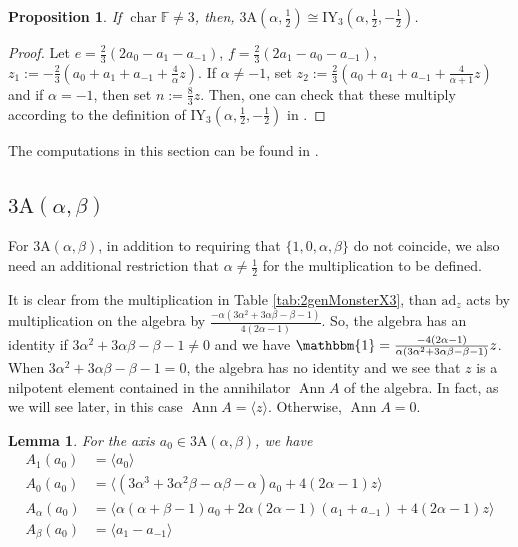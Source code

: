 \documentclass[11pt, a4paper]{article}
\theoremstyle{plain}
\newtheorem{lemma}[theorem]{Lemma}
\newtheorem{proposition}[theorem]{Proposition}
\theoremstyle{definition}
\newcommand\al{\alpha}
\newcommand\bt{\beta}
\newcommand\la{\langle}
\newcommand\ra{\rangle}
\newcommand\ad{\mathrm{ad}}
\DeclareMathOperator{\ch}{char}
\DeclareMathOperator{\Ann}{Ann}
\newcommand\FF{\mathbb{F}}
\newcommand{\A}{\mathrm{A}}
\newcommand{\IY}{\mathrm{IY}}
\newcommand{\0}{\overline{0}}
\newcommand{\2}{\overline{2}}
\newcommand{\1}{\mathbbm{1}}
\begin{document}
\begin{proposition}
If $\ch \FF \neq 3$, then, $3\A(\al, \frac{1}{2}) \cong \IY_3(\al, \frac{1}{2}, -\frac{1}{2})$.
\end{proposition}
\begin{proof}
Let $e = \frac{2}{3}(2a_0-a_1-a_{-1})$, $f = \frac{2}{3}(2a_1-a_0-a_{-1})$, $z_1 := -\frac{2}{3}(a_0 + a_1 + a_{-1} + \frac{4}{\al}z)$.  If $\al \neq -1$, set $z_2 := \frac{2}{3}(a_0 + a_1 + a_{-1} + \frac{4}{\al+1}z)$ and if $\al = -1$, then set $n := \frac{8}{3}z$.  Then, one can check that these multiply according to the definition of $\IY_3(\al, \frac{1}{2}, -\frac{1}{2})$ in \cite{splitspin}.
\end{proof}

The computations in this section can be found in \cite[\texttt{X3 algebras.m}]{githubcode}.


\subsection{$3\A(\al,\bt)$}

For $3\A(\al, \bt)$, in addition to requiring that $\{1,0,\al,\bt\}$ do not coincide, we also need an additional restriction that $\al \neq \frac{1}{2}$ for the multiplication to be defined.

It is clear from the multiplication in Table \ref{tab:2genMonsterX3}, than $\ad_z$ acts by multiplication on the algebra by $\frac{-\al(3\al^2 + 3\al\bt - \bt - 1)}{4(2\al-1)}$.  So, the algebra has an identity if $3\al^2 + 3\al\bt - \bt - 1 \neq 0$ and we have $\1 = \frac{-4(2\al -1)}{\al(3\al^2 + 3\al\bt - \bt - 1)} z$.  When $3\al^2 + 3\al\bt - \bt - 1 = 0$, the algebra has no identity and we see that $z$ is a nilpotent element contained in the annihilator $\Ann A$ of the algebra.  In fact, as we will see later, in this case $\Ann A = \la z \ra$. Otherwise, $\Ann A = 0$.

\begin{lemma}
For the axis $a_0 \in 3\A(\al,\bt)$, we have
\begin{align*}
A_1(a_0) &= \la a_0 \ra \\	
A_0(a_0) &= \la (3\al^3 + 3\al^2  \bt - \al \bt - \al)a_0 + 4(2\al - 1) z \ra \\
A_\al(a_0) &= \la \al(\al +\bt -1)a_0 + 2\al(2\al  -1) (a_1+a_{-1}) + 4(2\al - 1) z \ra \\
A_\bt(a_0) &= \la a_1 - a_{-1} \ra 
\end{align*}
\end{lemma}
\end{document}
